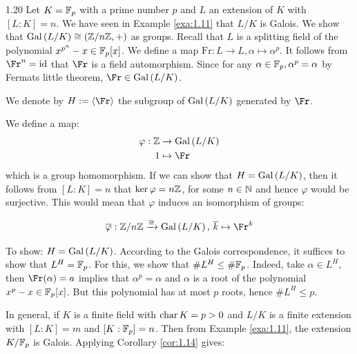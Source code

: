 \documentclass[twoside = false,	%
		headsepline,		%
		parskip = true,
		]{scrbook}						%
\begin{document}
    	\begin{example}{}{1.20}
    		Let $K= \mathbb F_p$ with a prime number $p$ and $L$ an extension of $K$ with $[L:K] = n$. We have seen in Example \ref{exa:1.11} that $L/K$ is Galois.
    		We show that $\mathrm{Gal}\left( L/K\right) \cong (\mathbb Z/n\mathbb Z,+)$ as groups.
    		Recall that $L$ is a splitting field of the polynomial $x^{p^n}-x \in \mathbb F_p[x]$. We define a map $\mathrm{Fr}: L \rightarrow L, \alpha \mapsto \alpha^p$. It follows from $\Fr^n = \id$ that $\Fr$ is a field automorphism. Since for any $\alpha \in \mathbb F_p, \alpha^p = \alpha$ by Fermats little theorem, $\Fr \in \Gal{L/K}$.
    		
    		We denote by $H:= \spitz{\Fr}$ the subgroup of $\mathrm{Gal}\left( L/K\right)$ generated by $\Fr$.
    		
    		We define a map:
    		\begin{equation*}
    			\begin{split}
    				\varphi: \Z &\rightarrow \Gal{L/K} \\
    						1 & \mapsto \Fr
    			\end{split}
    		\end{equation*}
    	which is a group homomorphism. If we can show that $H = \mathrm{Gal}\left( L/K\right)$, then it follows from $[L:K] = n$ that $\ker \varphi = n\mathbb Z$, for some $n \in \mathbb N$ and hence $\varphi$ would be surjective. This would mean that $\varphi$ induces an isomorphism of groups:
    	
    	\begin{equation*}
    		\overline{\varphi}: \Z/n\Z \xrightarrow{\cong} \Gal{L/K}, \, \overline{k} \mapsto \Fr^k
    	\end{equation*}
    	
    	To show: $H = \mathrm{Gal}\left( L/K\right)$. According to the Galois correspondence, it suffices to show that $L^H = \mathbb F_p$. For this, we show that $\#L^H \leq \# \mathbb F_p$. Indeed, take $\alpha \in L^H$, then $\Fr(\alpha) = a$ implies that $\alpha^p = \alpha$ and $\alpha$ is a root of the polynomial $x^p - x \in \mathbb F_p[x]$. But this polynomial has at most $p$ roots, hence $\# L^H \leq p$.
    	
    	In general, if $K$ is a finite field with $\mathrm{char} \, K = p > 0$ and $L/K$ is a finite extension with $[L:K] = m$ and $[K:\mathbb F_p] = n$. Then from Example \ref{exa:1.11}, the extension $K/\mathbb F_p$ is Galois. Applying Corollary \ref{cor:1.14} gives: %
    	

\end{example}
\end{document}

